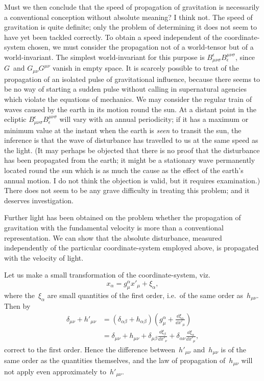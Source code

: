 \documentclass[12pt]{book}
\begin{document}
Must we then conclude that the speed of propagation of gravitation is
necessarily a conventional conception without absolute meaning? I think not.
The speed of gravitation is quite definite; only the problem of determining
it does not seem to have yet been tackled correctly. To obtain a speed independent
of the coordinate-system chosen, we must consider the propagation
not of a world-tensor but of a world-invariant. The simplest world-invariant
for this purpose is $B_{\mu\nu\sigma}^{\epsilon} B_{\epsilon}^{\mu\nu\sigma}$, since $G$~and $G_{\mu\nu}G^{\mu\nu}$ vanish in empty space. It is
scarcely possible to treat of the propagation of an isolated pulse of gravitational
influence, because there seems to be no way of starting a sudden pulse
without calling in supernatural agencies which violate the equations of
mechanics. We may consider the regular train of waves caused by the earth
in its motion round the sun. At a distant point in the ecliptic $B_{\mu\nu\sigma}^{\epsilon} B_{\epsilon}^{\mu\nu\sigma}$ will
vary with an annual periodicity; if it has a maximum or minimum value at
the instant when the earth is \emph{seen} to transit the sun, the inference is that the
wave of disturbance has travelled to us at the same speed as the light. (It
may perhaps be objected that there is no proof that the disturbance has been
propagated from the earth; it might be a stationary wave permanently
located round the sun which is as much the cause as the effect of the earth's
annual motion. I do not think the objection is valid, but it requires examination.)
There does not seem to be any grave difficulty in treating this problem;
and it deserves investigation.

Further light has been obtained on the problem whether the propagation of gravitation with the fundamental velocity
is more than a conventional representation.
We can show that the absolute disturbance, measured independently of the particular coordinate-system employed above,
is propagated with the velocity of light.

Let us make a small transformation of the coordinate-system, viz.
\[
x_\alpha = g^\alpha_\mu x'_\mu + \xi_\alpha,
\]
where the~$\xi_\alpha$ are small quantities of the first order, i.e.\ of the same order as~$h_{\mu\nu}$.
Then by~
\begin{align*}
\delta_{\mu\nu} + h'_{\mu\nu} & = (\delta_{\alpha\beta} + h_{\alpha\beta})
                                  \left(g^\alpha_\mu + \frac{\dd\xi_\alpha}{\dd x'_\mu}\right)\\
                              & = \delta_{\mu\nu} + h_{\mu\nu} + \delta_{\mu\beta}\frac{\dd\xi_\beta}{\dd x'_\nu} +
                                  \delta_{\alpha\nu}\frac{\dd\xi_\alpha}{\dd x'_\mu},
\end{align*}
correct to the first order.
Hence the difference between~$h'_{\mu\nu}$ and~$h_{\mu\nu}$ is of the same order as the quantities themselves,
and the law of propagation of~$h_{\mu\nu}$ will not apply even approximately to~$h'_{\mu\nu}$.
\end{document}
